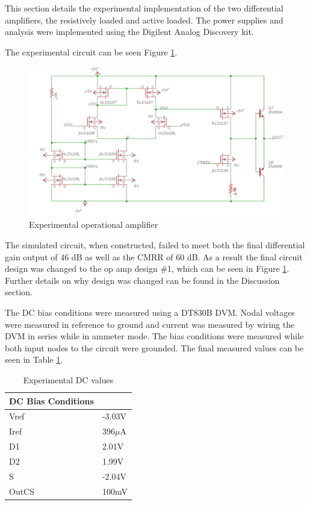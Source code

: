 




This section details the experimental implementation of the two differential amplifiers, the resistively loaded and active loaded. The power supplies and analysis were implemented using the Digilent Analog Discovery kit.

The experimental circuit can be seen Figure \ref{fig:expercircuit}.

\begin{figure}[H]
	\begin{center}
		\includegraphics[scale=.40]{ExperimentalImplementation/final_schem.png}
		\caption{Experimental operational amplifier}
		\label{fig:expercircuit}
	\end{center}
\end{figure}
The simulated circuit, when constructed, failed to meet both the final differential gain output of 46 dB as well as the CMRR of 60 dB. As a result the final circuit design was changed to the op amp design \#1, which can be seen in Figure \ref{fig:expercircuit}. Further details on why design was changed can be found in the Discussion section.

The DC bias conditions were measured using a DT830B DVM. Nodal voltages were measured in reference to ground and current was measured by wiring the DVM in series while in ammeter mode. The bias conditions were measured while both input nodes to the circuit were grounded. The final measured values can be seen in Table \ref{tab:expdc}.


\begin{table}[H]
	\centering
	\caption{Experimental DC values}
	\label{tab:expdc}
	\begin{tabular}{|l|l|}
		\hline
		\textbf{DC Bias Conditions} &           \\ \hline
		Vref                        & -3.03V    \\ \hline
		Iref                        & 396$\mu$A \\ \hline
		D1                          & 2.01V     \\ \hline
		D2                          & 1.99V     \\ \hline
		S                           & -2.04V    \\ \hline
		OutCS                       & 100mV      \\ \hline
	\end{tabular}
\end{table}

